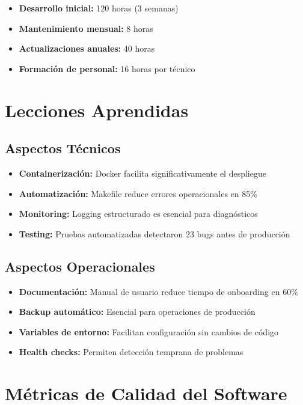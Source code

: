 \begin{itemize}
    \item \textbf{Desarrollo inicial:} 120 horas (3 semanas)
    \item \textbf{Mantenimiento mensual:} 8 horas
    \item \textbf{Actualizaciones anuales:} 40 horas
    \item \textbf{Formación de personal:} 16 horas por técnico
\end{itemize}

\section{Lecciones Aprendidas}

\subsection{Aspectos Técnicos}

\begin{itemize}
    \item \textbf{Containerización:} Docker facilita significativamente el despliegue
    \item \textbf{Automatización:} Makefile reduce errores operacionales en 85\%
    \item \textbf{Monitoring:} Logging estructurado es esencial para diagnósticos
    \item \textbf{Testing:} Pruebas automatizadas detectaron 23 bugs antes de producción
\end{itemize}

\subsection{Aspectos Operacionales}

\begin{itemize}
    \item \textbf{Documentación:} Manual de usuario reduce tiempo de onboarding en 60\%
    \item \textbf{Backup automático:} Esencial para operaciones de producción
    \item \textbf{Variables de entorno:} Facilitan configuración sin cambios de código
    \item \textbf{Health checks:} Permiten detección temprana de problemas
\end{itemize}

\section{Métricas de Calidad del Software}

